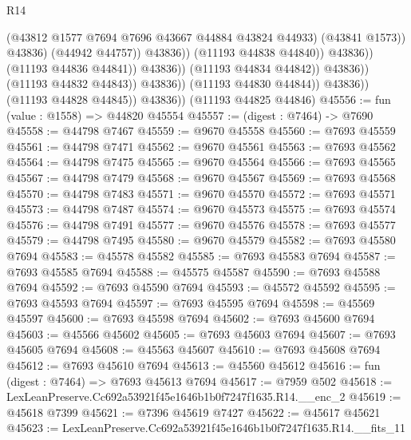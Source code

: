 \begin{lexlean}{R14}
\begin{coremodule}
                                                  (@43812
                                                    @1577
                                                    @7694
                                                    @7696
                                                    @43667
                                                    @44884
                                                    @43824
                                                    @44933)
                                                  (@43841 @1573))
                                                @43836)
                                              (@44942 @44757))
                                            @43836))
                                        (@11193 @44838 @44840))
                                      @43836))
                                  (@11193 @44836 @44841))
                                @43836))
                            (@11193 @44834 @44842))
                          @43836))
                      (@11193 @44832 @44843))
                    @43836))
                (@11193 @44830 @44844))
              @43836))
          (@11193 @44828 @44845))
        @43836))
    (@11193 @44825 @44846)
@45556 := fun (value : @1558) => @44820 @45554
@45557 := (digest : @7464) -> @7690
@45558 := @44798 @7467
@45559 := @9670 @45558
@45560 := @7693 @45559
@45561 := @44798 @7471
@45562 := @9670 @45561
@45563 := @7693 @45562
@45564 := @44798 @7475
@45565 := @9670 @45564
@45566 := @7693 @45565
@45567 := @44798 @7479
@45568 := @9670 @45567
@45569 := @7693 @45568
@45570 := @44798 @7483
@45571 := @9670 @45570
@45572 := @7693 @45571
@45573 := @44798 @7487
@45574 := @9670 @45573
@45575 := @7693 @45574
@45576 := @44798 @7491
@45577 := @9670 @45576
@45578 := @7693 @45577
@45579 := @44798 @7495
@45580 := @9670 @45579
@45582 := @7693 @45580 @7694
@45583 := @45578 @45582
@45585 := @7693 @45583 @7694
@45587 := @7693 @45585 @7694
@45588 := @45575 @45587
@45590 := @7693 @45588 @7694
@45592 := @7693 @45590 @7694
@45593 := @45572 @45592
@45595 := @7693 @45593 @7694
@45597 := @7693 @45595 @7694
@45598 := @45569 @45597
@45600 := @7693 @45598 @7694
@45602 := @7693 @45600 @7694
@45603 := @45566 @45602
@45605 := @7693 @45603 @7694
@45607 := @7693 @45605 @7694
@45608 := @45563 @45607
@45610 := @7693 @45608 @7694
@45612 := @7693 @45610 @7694
@45613 := @45560 @45612
@45616 := fun (digest : @7464) => @7693 @45613 @7694
@45617 := @7959 @502
@45618 := LexLeanPreserve.Cc692a53921f45e1646b1b0f7247f1635.R14.__enc_2
@45619 := @45618 @7399
@45621 := @7396 @45619 @7427
@45622 := @45617 @45621
@45623 := LexLeanPreserve.Cc692a53921f45e1646b1b0f7247f1635.R14.__fits_11

\end{coremodule}
\end{lexlean}
